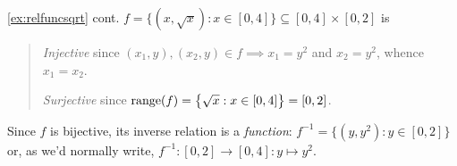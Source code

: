 \begin{example*}{\ref{ex:relfuncsqrt} cont.}{}
	$f=\bigl\{(x,\sqrt x):x\in[0,4]\bigr\}\subseteq [0,4]\times[0,2]$ is
	\begin{quote}
		\emph{Injective} since $(x_1,y),(x_2,y)\in f\implies x_1=y^2$ and $x_2=y^2$, whence $x_1=x_2$.\par
		\emph{Surjective} since $\operatorname{range}(f)=\bigl\{\sqrt x:x\in[0,4]\bigr\}=[0,2]$.
	\end{quote}
	Since $f$ is bijective, its inverse relation is a \emph{function}: $f^{-1}=\bigl\{(y,y^2):y\in[0,2]\bigr\}$ or, as we'd normally write, $f^{-1}:[0,2]\to[0,4]:y\mapsto y^2$.
\end{example*}
 


\goodbreak


